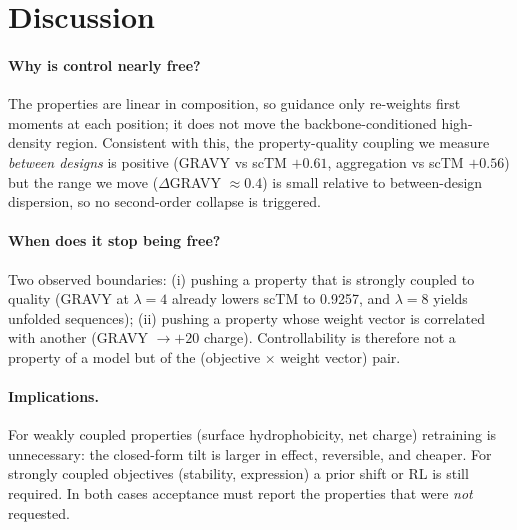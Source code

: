 \section{Discussion}
\label{sec:discussion}

\paragraph{Why is control nearly free?}
The properties are linear in composition, so guidance only re-weights first
moments at each position; it does not move the backbone-conditioned
high-density region. Consistent with this, the property-quality coupling we
measure \emph{between designs} is positive (GRAVY vs scTM $+0.61$, aggregation
vs scTM $+0.56$) but the range we move ($\Delta$GRAVY $\approx 0.4$) is small
relative to between-design dispersion, so no second-order collapse is
triggered.

\paragraph{When does it stop being free?}
Two observed boundaries: (i) pushing a property that is strongly coupled to
quality (GRAVY at $\lambda{=}4$ already lowers scTM to 0.9257, and
$\lambda{=}8$ yields unfolded sequences); (ii) pushing a property whose weight
vector is correlated with another (GRAVY $\to +20$ charge). Controllability is
therefore not a property of a model but of the (objective $\times$ weight
vector) pair.

\paragraph{Implications.}
For weakly coupled properties (surface hydrophobicity, net charge) retraining
is unnecessary: the closed-form tilt is larger in effect, reversible, and
cheaper. For strongly coupled objectives (stability, expression) a prior shift
or RL is still required. In both cases acceptance must report the properties
that were \emph{not} requested.
